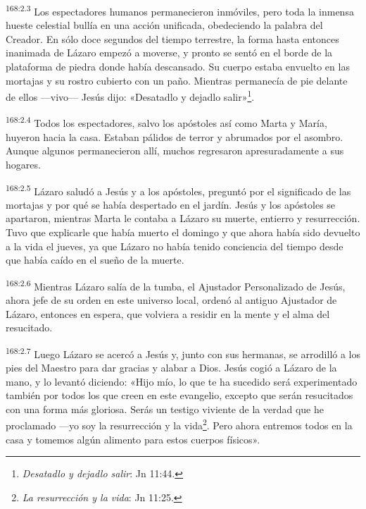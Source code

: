 \par
\textsuperscript{168:2.3} Los espectadores humanos permanecieron inmóviles, pero toda la inmensa hueste celestial bullía en una acción unificada, obedeciendo la palabra del Creador. En sólo doce segundos del tiempo terrestre, la forma hasta entonces inanimada de Lázaro empezó a moverse, y pronto se sentó en el borde de la plataforma de piedra donde había descansado. Su cuerpo estaba envuelto en las mortajas y su rostro cubierto con un paño. Mientras permanecía de pie delante de ellos ---vivo--- Jesús dijo: «Desatadlo y dejadlo salir»\footnote{\textit{Desatadlo y dejadlo salir}: Jn 11:44.}.

\par
\textsuperscript{168:2.4} Todos los espectadores, salvo los apóstoles así como Marta y María, huyeron hacia la casa. Estaban pálidos de terror y abrumados por el asombro. Aunque algunos permanecieron allí, muchos regresaron apresuradamente a sus hogares.

\par
\textsuperscript{168:2.5} Lázaro saludó a Jesús y a los apóstoles, preguntó por el significado de las mortajas y por qué se había despertado en el jardín. Jesús y los apóstoles se apartaron, mientras Marta le contaba a Lázaro su muerte, entierro y resurrección. Tuvo que explicarle que había muerto el domingo y que ahora había sido devuelto a la vida el jueves, ya que Lázaro no había tenido conciencia del tiempo desde que había caído en el sueño de la muerte.

\par
\textsuperscript{168:2.6} Mientras Lázaro salía de la tumba, el Ajustador Personalizado de Jesús, ahora jefe de su orden en este universo local, ordenó al antiguo Ajustador de Lázaro, entonces en espera, que volviera a residir en la mente y el alma del resucitado.

\par
\textsuperscript{168:2.7} Luego Lázaro se acercó a Jesús y, junto con sus hermanas, se arrodilló a los pies del Maestro para dar gracias y alabar a Dios. Jesús cogió a Lázaro de la mano, y lo levantó diciendo: «Hijo mío, lo que te ha sucedido será experimentado también por todos los que creen en este evangelio, excepto que serán resucitados con una forma más gloriosa. Serás un testigo viviente de la verdad que he proclamado ---yo soy la resurrección y la vida\footnote{\textit{La resurrección y la vida}: Jn 11:25.}. Pero ahora entremos todos en la casa y tomemos algún alimento para estos cuerpos físicos».

